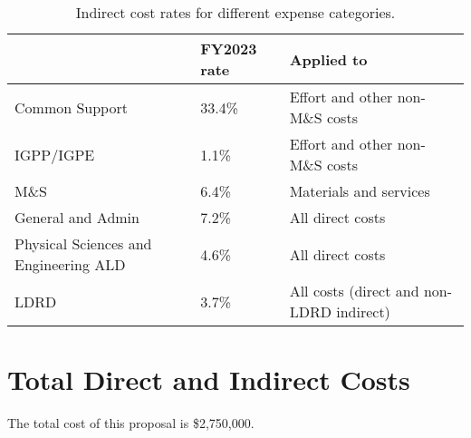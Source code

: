 \documentclass[letter, USenglish, 11pt, subfigure]{article}
\begin{document}
\begin{table}[!htpb]
  \begin{center}  
    \caption{Indirect cost rates for different expense categories.}
    \label{tab:indirectRates}
    \begin{tabular}{lll}
      \hline
      {} & FY2023 rate & Applied to  \\
      \hline
      Common Support & 33.4\% & Effort and other non-M\&S costs\\
      IGPP/IGPE & 1.1\% &  Effort and other non-M\&S costs \\
      M\&S & 6.4\% & Materials and services\\
      General and Admin & 7.2\% & All direct costs\\
      Physical Sciences and Engineering ALD & 4.6\% & All direct costs\\
      LDRD & 3.7\% & All costs (direct and non-LDRD indirect)\\
      \hline
    \end{tabular}
  \end{center}
\end{table}


\section{Total Direct and Indirect Costs}
\label{subsec:totalCosts}
The total cost of this proposal is \$2,750,000. 


\clearpage


\end{document}
